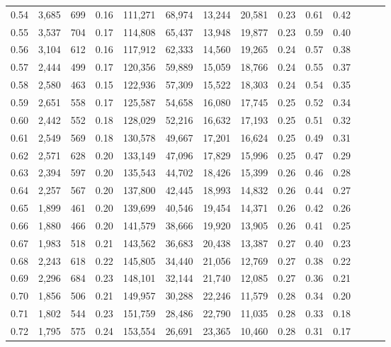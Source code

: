 \begin{tabular}{rrrrrrrrrrrrrr}
0.54 &  3,685 &  699 &  0.16 &  111,271 &   68,974 &  13,244 &  20,581 &  0.23 &  0.61 &      0.42 \\
0.55 &  3,537 &  704 &  0.17 &  114,808 &   65,437 &  13,948 &  19,877 &  0.23 &  0.59 &      0.40 \\
0.56 &  3,104 &  612 &  0.16 &  117,912 &   62,333 &  14,560 &  19,265 &  0.24 &  0.57 &      0.38 \\
0.57 &  2,444 &  499 &  0.17 &  120,356 &   59,889 &  15,059 &  18,766 &  0.24 &  0.55 &      0.37 \\
0.58 &  2,580 &  463 &  0.15 &  122,936 &   57,309 &  15,522 &  18,303 &  0.24 &  0.54 &      0.35 \\
0.59 &  2,651 &  558 &  0.17 &  125,587 &   54,658 &  16,080 &  17,745 &  0.25 &  0.52 &      0.34 \\
0.60 &  2,442 &  552 &  0.18 &  128,029 &   52,216 &  16,632 &  17,193 &  0.25 &  0.51 &      0.32 \\
0.61 &  2,549 &  569 &  0.18 &  130,578 &   49,667 &  17,201 &  16,624 &  0.25 &  0.49 &      0.31 \\
0.62 &  2,571 &  628 &  0.20 &  133,149 &   47,096 &  17,829 &  15,996 &  0.25 &  0.47 &      0.29 \\
0.63 &  2,394 &  597 &  0.20 &  135,543 &   44,702 &  18,426 &  15,399 &  0.26 &  0.46 &      0.28 \\
0.64 &  2,257 &  567 &  0.20 &  137,800 &   42,445 &  18,993 &  14,832 &  0.26 &  0.44 &      0.27 \\
0.65 &  1,899 &  461 &  0.20 &  139,699 &   40,546 &  19,454 &  14,371 &  0.26 &  0.42 &      0.26 \\
0.66 &  1,880 &  466 &  0.20 &  141,579 &   38,666 &  19,920 &  13,905 &  0.26 &  0.41 &      0.25 \\
0.67 &  1,983 &  518 &  0.21 &  143,562 &   36,683 &  20,438 &  13,387 &  0.27 &  0.40 &      0.23 \\
0.68 &  2,243 &  618 &  0.22 &  145,805 &   34,440 &  21,056 &  12,769 &  0.27 &  0.38 &      0.22 \\
0.69 &  2,296 &  684 &  0.23 &  148,101 &   32,144 &  21,740 &  12,085 &  0.27 &  0.36 &      0.21 \\
0.70 &  1,856 &  506 &  0.21 &  149,957 &   30,288 &  22,246 &  11,579 &  0.28 &  0.34 &      0.20 \\
0.71 &  1,802 &  544 &  0.23 &  151,759 &   28,486 &  22,790 &  11,035 &  0.28 &  0.33 &      0.18 \\
0.72 &  1,795 &  575 &  0.24 &  153,554 &   26,691 &  23,365 &  10,460 &  0.28 &  0.31 &      0.17 \\

\end{tabular}
